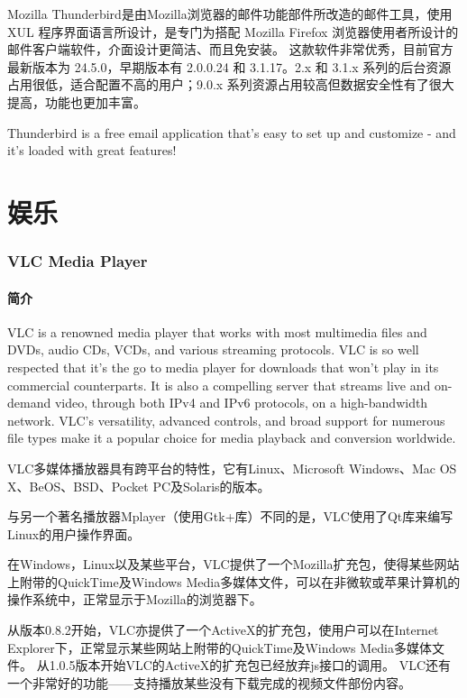 \documentclass[paper=a4,fontsize=11pt]{article}
\begin{document}
	Mozilla Thunderbird是由Mozilla浏览器的邮件功能部件所改造的邮件工具，使用 XUL 程序界面语言所设计，是专门为搭配 Mozilla Firefox 浏览器使用者所设计的邮件客户端软件，介面设计更简洁、而且免安装。 这款软件非常优秀，目前官方最新版本为 24.5.0，早期版本有 2.0.0.24 和 3.1.17。2.x 和 3.1.x 系列的后台资源占用很低，适合配置不高的用户；9.0.x 系列资源占用较高但数据安全性有了很大提高，功能也更加丰富。
	
	Thunderbird is a free email application that's easy to set up and customize - and it's loaded with great features!
	
	\clearpage
	
	\part{娱乐}
	
	\clearpage
	
	\section{VLC Media Player}	
	
	\subsection{简介}
	VLC is a renowned media player that works with most multimedia files and DVDs, audio CDs, VCDs, and various streaming protocols. VLC is so well respected that it’s the go to media player for downloads that won’t play in its commercial counterparts. It is also a compelling server that streams live and on-demand video, through both IPv4 and IPv6 protocols, on a high-bandwidth network. VLC’s versatility, advanced controls, and broad support for numerous file types make it a popular choice for media playback and conversion worldwide. 
	
	VLC多媒体播放器具有跨平台的特性，它有Linux、Microsoft Windows、Mac OS X、BeOS、BSD、Pocket PC及Solaris的版本。
	
	与另一个著名播放器Mplayer（使用Gtk+库）不同的是，VLC使用了Qt库来编写Linux的用户操作界面。
	
	在Windows，Linux以及某些平台，VLC提供了一个Mozilla扩充包，使得某些网站上附带的QuickTime及Windows Media多媒体文件，可以在非微软或苹果计算机的操作系统中，正常显示于Mozilla的浏览器下。
	
	从版本0.8.2开始，VLC亦提供了一个ActiveX的扩充包，使用户可以在Internet Explorer下，正常显示某些网站上附带的QuickTime及Windows Media多媒体文件。
	从1.0.5版本开始VLC的ActiveX的扩充包已经放弃js接口的调用。
	VLC还有一个非常好的功能——支持播放某些没有下载完成的视频文件部份内容。
	
\end{document}
